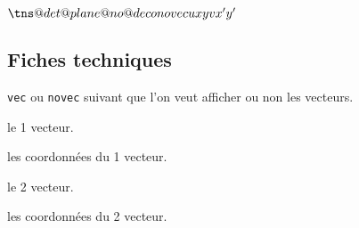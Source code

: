 \documentclass[12pt,a4paper]{article}
\begin{document}
\begin{latexex}
\makeatletter
$\tns@det@plane@no@deco{novec}   %
                       {u}{x}{y} %
                       {v}{x'}{y'}$
\makeatother
\end{latexex}




\subsection{Fiches techniques}




 \verb+vec+ ou \verb+novec+ suivant que l'on veut afficher ou non les vecteurs. 

 le 1\ier{} vecteur.

 les coordonnées du 1\ier{} vecteur.

 le 2\ieme{} vecteur.

 les coordonnées du 2\ieme{} vecteur.
\end{document}
